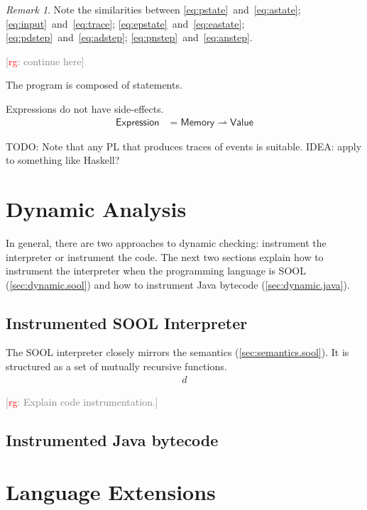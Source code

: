 \documentclass[preprint]{sigplanconf} %
\newcommand{\note}[2]{\textcolor{gray}{[\textcolor{red}{#1}: #2]}}
\newcommand{\rg}[1]{\note{rg}{#1}}
\newcommand{\pmap}{\rightharpoonup}
\newcommand{\set}[1]{\ensuremath{\mathsf{#1}}}
\theoremstyle{definition}
\theoremstyle{remark}
\newtheorem{remark}{Remark}
\begin{document}
\begin{remark}
\def\.#1#2{\eqref{eq:#1}~and~\eqref{eq:#2}}
Note the similarities between \.{pstate}{astate}; \.{input}{trace}; \.{epstate}{eastate}; \.{pdstep}{adstep}; \.{pnstep}{anstep}.
\end{remark}

\rg{continue here}

The program is composed of statements.

Expressions do not have side-effects.
\begin{align}
\set{Expression}&=\set{Memory}\pmap\set{Value}
\end{align}


TODO: Note that any PL that produces traces of events is suitable.
IDEA: apply to something like Haskell?

\section{Dynamic Analysis}\label{sec:dynamic} %

In general, there are two approaches to dynamic checking: instrument the interpreter or instrument the code.
The next two sections explain how to instrument the interpreter when the programming language is SOOL (\autoref{sec:dynamic.sool}) and how to instrument Java bytecode (\autoref{sec:dynamic.java}).

\subsection{Instrumented SOOL Interpreter}\label{sec:dynamic.sool} %

The SOOL interpreter closely mirrors the semantics (\autoref{sec:semantics.sool}).
It is structured as a set of mutually recursive functions.
\begin{equation}
\begin{aligned}
d
\end{aligned}
\end{equation}

\rg{Explain code instrumentation.}

\subsection{Instrumented Java bytecode}\label{sec:dynamic.java} %

\section{Language Extensions} \label{sec:extensions} %
\end{document}

